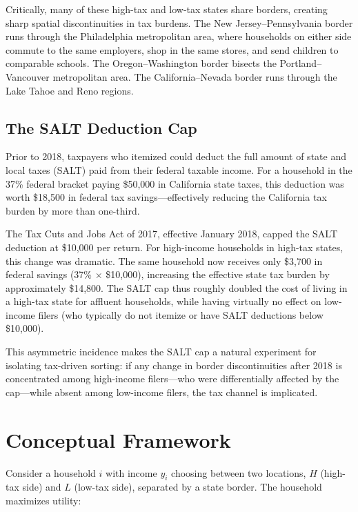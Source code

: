 \documentclass[12pt]{article}
\begin{document}
Critically, many of these high-tax and low-tax states share borders, creating sharp spatial discontinuities in tax burdens. The New Jersey--Pennsylvania border runs through the Philadelphia metropolitan area, where households on either side commute to the same employers, shop in the same stores, and send children to comparable schools. The Oregon--Washington border bisects the Portland--Vancouver metropolitan area. The California--Nevada border runs through the Lake Tahoe and Reno regions.

\subsection{The SALT Deduction Cap}

Prior to 2018, taxpayers who itemized could deduct the full amount of state and local taxes (SALT) paid from their federal taxable income. For a household in the 37\% federal bracket paying \$50,000 in California state taxes, this deduction was worth \$18,500 in federal tax savings---effectively reducing the California tax burden by more than one-third.

The Tax Cuts and Jobs Act of 2017, effective January 2018, capped the SALT deduction at \$10,000 per return. For high-income households in high-tax states, this change was dramatic. The same household now receives only \$3,700 in federal savings (37\% $\times$ \$10,000), increasing the effective state tax burden by approximately \$14,800. The SALT cap thus roughly doubled the cost of living in a high-tax state for affluent households, while having virtually no effect on low-income filers (who typically do not itemize or have SALT deductions below \$10,000).

This asymmetric incidence makes the SALT cap a natural experiment for isolating tax-driven sorting: if any change in border discontinuities after 2018 is concentrated among high-income filers---who were differentially affected by the cap---while absent among low-income filers, the tax channel is implicated.


\section{Conceptual Framework}
\label{sec:framework}

Consider a household $i$ with income $y_i$ choosing between two locations, $H$ (high-tax side) and $L$ (low-tax side), separated by a state border. The household maximizes utility:
\end{document}
